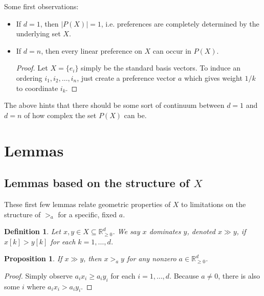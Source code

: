 \documentclass[12pt]{article}
\newtheorem*{definition}{Definition}
\newtheorem{proposition}[theorem]{Proposition}
\newcommand{\Rgz}{\mathbb{R}_{\ge 0}}
\newcommand{\1}[1]{\mathds{1}[{#1}]}
\begin{document}
  Some first observations:
  \begin{itemize}
    \item If $d=1$, then $|P(X)| = 1$, i.e. preferences are completely
      determined by the underlying set $X$.
    \item If $d=n$, then every linear preference on $X$ can occur in $P(X)$.
      \begin{proof}
        Let $X = \{e_i\}$ simply be the standard basis vectors.
        To induce an ordering $i_1, i_2, \ldots, i_n$, just create a preference
        vector $a$ which gives weight $1/k$ to coordinate $i_k$.
      \end{proof}
  \end{itemize}
  The above hints that there should be some sort of continuum between $d=1$
  and $d=n$ of how complex the set $P(X)$ can be.

\section{Lemmas}
  \subsection{Lemmas based on the structure of $X$}
    These first few lemmas relate geometric properties of $X$ to
    limitations on the structure of $>_a$ for a specific, fixed $a$.

    \begin{definition}
      Let $x,y\in X\subseteq \Rgz^d$.
      We say $x$ \emph{dominates} $y$, denoted $x\gg y$,
      if $x[k] > y[k]$ for each $k=1,\ldots,d$.
    \end{definition}
    \begin{proposition}
      If $x \gg y$, then $x >_a y$ for any nonzero $a\in \Rgz^d$.
    \end{proposition}
    \begin{proof}
      Simply observe $a_i x_i \ge a_i y_i$ for each $i=1,\ldots, d$.
      Because $a\ne 0$, there is also some $i$ where $a_i x_i > a_i y_i$.
    \end{proof}
\end{document}
